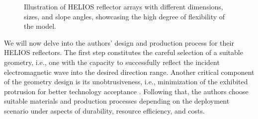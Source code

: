 \begin{figure}[tb]
	\centering
		\hfill
		\hfill
	\caption[Illustration of HELIOS reflector arrays with different dimensions, sizes, and slope angles, showcasing the high degree of flexibility of the model.]{Illustration of HELIOS reflector arrays with different dimensions, sizes, and slope angles, showcasing the high degree of flexibility of the model.}
	\label{fig:model_array}
\end{figure}
We will now delve into the authors' design and production process for their HELIOS reflectors. The first step constitutes the careful selection of a suitable geometry, i.e., one with the capacity to successfully reflect the incident electromagnetic wave into the desired direction range. Another critical component of the geometry design is its unobtrusiveness, i.e., minimization of the exhibited protrusion for better technology acceptance \cite{Helios}. Following that, the authors choose suitable materials and production processes depending on the deployment scenario under aspects of durability, resource efficiency, and costs.

